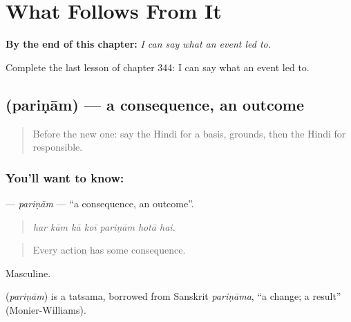 
\chapter{What Follows From It}
\label{ch:hi-what-follows-from-it}

\begin{chapteropening}
\textbf{By the end of this chapter:} \emph{I can say what an event led to.}

Complete the last lesson of chapter 344: I can say what an event led to.
\end{chapteropening}

\section[\texorpdfstring{\hi{परिणाम} (pariṇām)}{परिणाम (pariṇām)}]{ (pariṇām) — a consequence, an outcome}

\label{lesson:HI-C344-parinam}



\begin{quote}
Before the new one: say the Hindi for a basis, grounds, then the Hindi for responsible.
\end{quote}

\subsection*{You'll want to know: }
\textbf{} — \emph{pariṇām} — \textquotedblleft{}a consequence, an outcome\textquotedblright{}.

\begin{quote}
      
\end{quote}

\begin{quote}
\emph{har kām kā koī pariṇām hotā hai.}
\end{quote}

\begin{quote}
Every action has some consequence.
\end{quote}

Masculine.

\begin{cousinweb}
\textbf{} (\emph{pariṇām}) is a tatsama, borrowed from Sanskrit \emph{pariṇāma}, \textquotedblleft{}a change; a result\textquotedblright{} (Monier-Williams).
\end{cousinweb}

